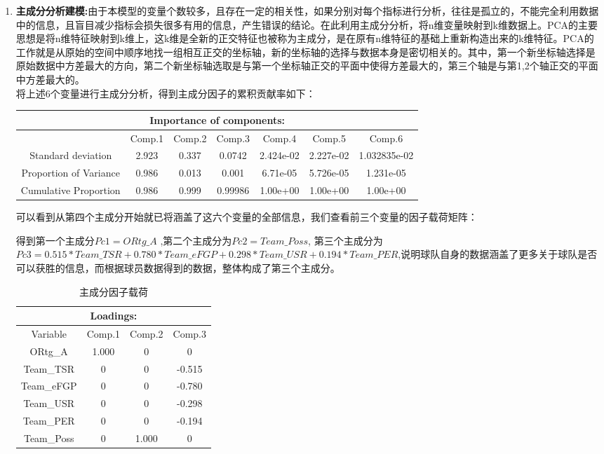 \begin{enumerate}
	


	
\item {\bfseries 主成分分析建模:}由于本模型的变量个数较多，且存在一定的相关性，如果分别对每个指标进行分析，往往是孤立的，不能完全利用数据中的信息，且盲目减少指标会损失很多有用的信息，产生错误的结论。在此利用主成分分析，将n维变量映射到k维数据上。PCA的主要思想是将n维特征映射到k维上，这k维是全新的正交特征也被称为主成分，是在原有n维特征的基础上重新构造出来的k维特征。PCA的工作就是从原始的空间中顺序地找一组相互正交的坐标轴，新的坐标轴的选择与数据本身是密切相关的。其中，第一个新坐标轴选择是原始数据中方差最大的方向，第二个新坐标轴选取是与第一个坐标轴正交的平面中使得方差最大的，第三个轴是与第1,2个轴正交的平面中方差最大的。
\\
将上述6个变量进行主成分分析，得到主成分因子的累积贡献率如下：
\begin{table}[h]
	\begin{tabular}{|c|c|c|c|c|c|c|}
		\hline
		\multicolumn{7}{|c|}{ Importance of components:} \\
		\hline
		                        & Comp.1&     Comp.2  &     Comp.3     &  Comp.4    &   Comp.5   &    Comp.6\\
		Standard deviation  &   2.923 &0.337 &0.0742 &2.424e-02&2.227e-02 &1.032835e-02\\
		Proportion of Variance& 0.986&0.013& 0.001& 6.71e-05& 5.726e-05 &1.231e-05\\
		Cumulative Proportion & 0.986& 0.999& 0.99986 &1.00e+00& 1.00e+00 &1.00e+00\\
		\hline
	\end{tabular}
\end{table}
可以看到从第四个主成分开始就已将涵盖了这六个变量的全部信息，我们查看前三个变量的因子载荷矩阵：

 得到第一个主成分$Pc1 =  ORtg\_A    $ ,第二个主成分为$Pc2 = Team\_Poss$, 第三个主成分为$Pc3 = 0.515*Team\_TSR+0.780*Team\_eFGP+0.298 *Team\_USR+0.194*Team\_PER$,说明球队自身的数据涵盖了更多关于球队是否可以获胜的信息，而根据球员数据得到的数据，整体构成了第三个主成分。
 
                      
\begin{table}[h]
	\begin{tabular}{|c|c|c|c|}
		\hline
		\multicolumn{4}{|c|}{Loadings:}\\
		\hline
		Variable	&Comp.1 &Comp.2& Comp.3 \\
		ORtg\_A   &  1.000    & 0& 0\\                              
		Team\_TSR   &   0       & 0&  -0.515\\ 
		Team\_eFGP  & 0&    0&         -0.780 \\
		Team\_USR     &0&0       &    -0.298 \\ 
		Team\_PER  &0&       0&       -0.194\\  
		Team\_Poss     &0&   1.000  &0\\    
		\hline                      
	\end{tabular}
	\centering
	\label{tab:11}
	\caption{主成分因子载荷}
\end{table}


\end{enumerate}
